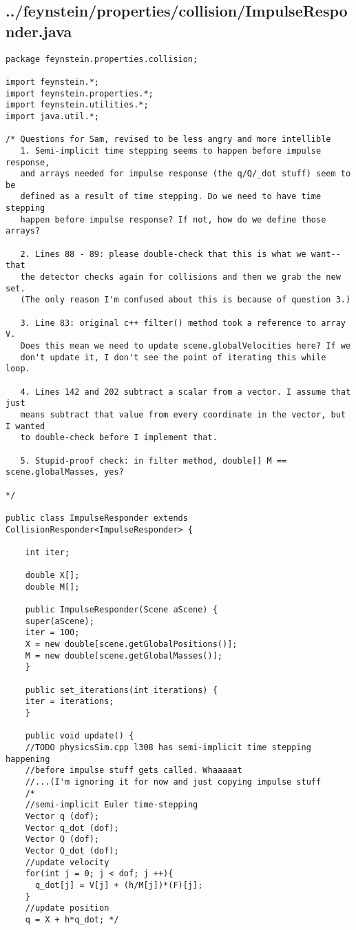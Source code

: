 \subsection*{../feynstein/properties/collision/ImpulseResponder.java}
\begin{lstlisting}
package feynstein.properties.collision;

import feynstein.*;
import feynstein.properties.*;
import feynstein.utilities.*;
import java.util.*;

/* Questions for Sam, revised to be less angry and more intellible
   1. Semi-implicit time stepping seems to happen before impulse response,
   and arrays needed for impulse response (the q/Q/_dot stuff) seem to be
   defined as a result of time stepping. Do we need to have time stepping 
   happen before impulse response? If not, how do we define those arrays?
   
   2. Lines 88 - 89: please double-check that this is what we want--that
   the detector checks again for collisions and then we grab the new set.
   (The only reason I'm confused about this is because of question 3.)

   3. Line 83: original c++ filter() method took a reference to array V. 
   Does this mean we need to update scene.globalVelocities here? If we 
   don't update it, I don't see the point of iterating this while loop.

   4. Lines 142 and 202 subtract a scalar from a vector. I assume that just
   means subtract that value from every coordinate in the vector, but I wanted
   to double-check before I implement that.

   5. Stupid-proof check: in filter method, double[] M == scene.globalMasses, yes?

*/

public class ImpulseResponder extends CollisionResponder<ImpulseResponder> {

    int iter;

    double X[];
    double M[];

    public ImpulseResponder(Scene aScene) {
	super(aScene);
	iter = 100;
	X = new double[scene.getGlobalPositions()];
	M = new double[scene.getGlobalMasses()];
    }

    public set_iterations(int iterations) {
	iter = iterations;
    }
    
    public void update() {
	//TODO physicsSim.cpp l308 has semi-implicit time stepping happening
	//before impulse stuff gets called. Whaaaaat
	//...(I'm ignoring it for now and just copying impulse stuff
	/*
	//semi-implicit Euler time-stepping
	Vector q (dof);
	Vector q_dot (dof);
	Vector Q (dof);
	Vector Q_dot (dof);
	//update velocity
	for(int j = 0; j < dof; j ++){
	  q_dot[j] = V[j] + (h/M[j])*(F)[j];
	}
	//update position
	q = X + h*q_dot; */


\end{lstlisting}
